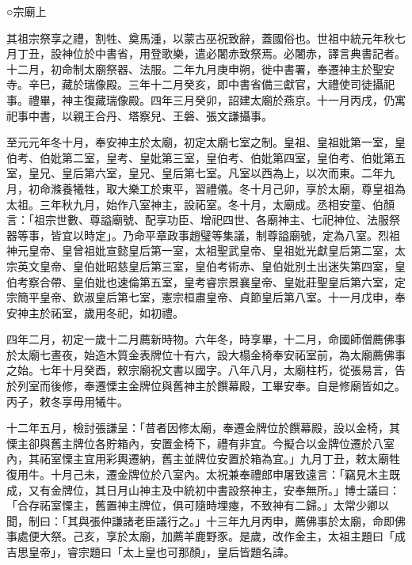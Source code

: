 
\begin{pinyinscope}

 ○宗廟上



 其祖宗祭享之禮，割牲、奠馬湩，以蒙古巫祝致辭，蓋國俗也。世祖中統元年秋七月丁丑，設神位於中書省，用登歌樂，遣必闍赤致祭焉。必闍赤，譯言典書記者。十二月，初命制太廟祭器、法服。二年九月庚申朔，徙中書署，奉遷神主於聖安寺。辛巳，藏於瑞像殿。三年十二月癸亥，即中書省備三獻官，大禮使司徒攝祀事。禮畢，神主復藏瑞像殿。四年三月癸卯，詔建太廟於燕京。十一月丙戌，仍寓祀事中書，以親王合丹、塔察兒、王磐、張文謙攝事。



 至元元年冬十月，奉安神主於太廟，初定太廟七室之制。皇祖、皇祖妣第一室，皇伯考、伯妣第二室，皇考、皇妣第三室，皇伯考、伯妣第四室，皇伯考、伯妣第五室，皇兄、皇后第六室，皇兄、皇后第七室。凡室以西為上，以次而東。二年九月，初命滌養犧牲，取大樂工於東平，習禮儀。冬十月己卯，享於太廟，尊皇祖為太祖。三年秋九月，始作八室神主，設祏室。冬十月，太廟成。丞相安童、伯顏言：「祖宗世數、尊謚廟號、配享功臣、增祀四世、各廟神主、七祀神位、法服祭器等事，皆宜以時定」。乃命平章政事趙璧等集議，制尊謚廟號，定為八室。烈祖神元皇帝、皇曾祖妣宣懿皇后第一室，太祖聖武皇帝、皇祖妣光獻皇后第二室，太宗英文皇帝、皇伯妣昭慈皇后第三室，皇伯考術赤、皇伯妣別土出迷失第四室，皇伯考察合帶、皇伯妣也速倫第五室，皇考睿宗景襄皇帝、皇妣莊聖皇后第六室，定宗簡平皇帝、欽淑皇后第七室，憲宗桓肅皇帝、貞節皇后第八室。十一月戊申，奉安神主於祏室，歲用冬祀，如初禮。



 四年二月，初定一歲十二月薦新時物。六年冬，時享畢，十二月，命國師僧薦佛事於太廟七晝夜，始造木質金表牌位十有六，設大榻金椅奉安祏室前，為太廟薦佛事之始。七年十月癸酉，敕宗廟祝文書以國字。八年八月，太廟柱朽，從張易言，告於列室而後修，奉遷慄主金牌位與舊神主於饌幕殿，工畢安奉。自是修廟皆如之。丙子，敕冬享毋用犧牛。



 十二年五月，檢討張謙呈：「昔者因修太廟，奉遷金牌位於饌幕殿，設以金椅，其慄主卻與舊主牌位各貯箱內，安置金椅下，禮有非宜。今擬合以金牌位遷於八室內，其祏室慄主宜用彩輿遷納，舊主並牌位安置於箱為宜。」九月丁丑，敕太廟牲復用牛。十月己未，遷金牌位於八室內。太祝兼奉禮郎申屠致遠言：「竊見木主既成，又有金牌位，其日月山神主及中統初中書設祭神主，安奉無所。」博士議曰：「合存祏室慄主，舊置神主牌位，俱可隨時埋瘞，不致神有二歸。」太常少卿以聞，制曰：「其與張仲謙諸老臣議行之。」十三年九月丙申，薦佛事於太廟，命即佛事處便大祭。己亥，享於太廟，加薦羊鹿野豕。是歲，改作金主，太祖主題曰「成吉思皇帝」，睿宗題曰「太上皇也可那顏」，皇后皆題名諱。




\end{pinyinscope}
